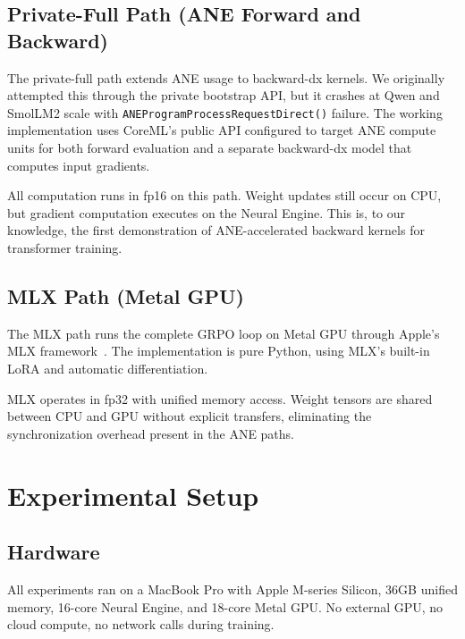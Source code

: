 \documentclass[11pt]{article}
\begin{document}
\subsection{Private-Full Path (ANE Forward and Backward)}

The private-full path extends ANE usage to backward-dx kernels.  We originally attempted this through the private bootstrap API, but it crashes at Qwen and SmolLM2 scale with \texttt{ANEProgram\-Process\-Request\-Direct()} failure.  The working implementation uses CoreML's public API configured to target ANE compute units for both forward evaluation and a separate backward-dx model that computes input gradients.

All computation runs in fp16 on this path.  Weight updates still occur on CPU, but gradient computation executes on the Neural Engine.  This is, to our knowledge, the first demonstration of ANE-accelerated backward kernels for transformer training.

\subsection{MLX Path (Metal GPU)}

The MLX path runs the complete GRPO loop on Metal GPU through Apple's MLX framework~\cite{hannun2023mlx}.  The implementation is pure Python, using MLX's built-in LoRA and automatic differentiation.

MLX operates in fp32 with unified memory access.  Weight tensors are shared between CPU and GPU without explicit transfers, eliminating the synchronization overhead present in the ANE paths.

\section{Experimental Setup}
\label{sec:setup}

\subsection{Hardware}

All experiments ran on a MacBook Pro with Apple M-series Silicon, 36GB unified memory, 16-core Neural Engine, and 18-core Metal GPU.  No external GPU, no cloud compute, no network calls during training.
\end{document}

